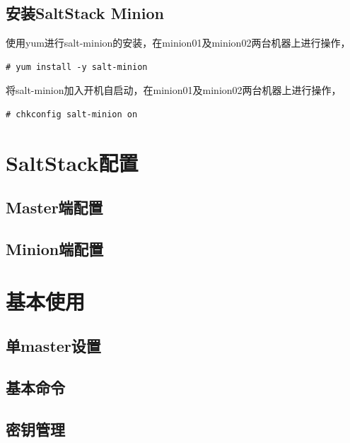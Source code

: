 \subsection{安装SaltStack Minion}
\label{sec:installSaltMinion}

使用yum进行salt-minion的安装，在minion01及minion02两台机器上进行操作，

\begin{verbatim}
# yum install -y salt-minion
\end{verbatim}

将salt-minion加入开机自启动，在minion01及minion02两台机器上进行操作，

\begin{verbatim}
# chkconfig salt-minion on
\end{verbatim}

\section{SaltStack配置}
\label{sec:saltConfigure}

\subsection{Master端配置}
\label{sec:masterConfigure}

\subsection{Minion端配置}
\label{sec:minionConfigure}

\section{基本使用}
\label{sec:basicUsage}

\subsection{单master设置}
\label{sec:singleMasterSetup}

\subsection{基本命令}
\label{sec:basicSaltCommand}

\subsection{密钥管理}
\label{sec:saltKeyManagement}

